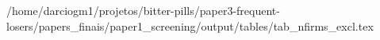 /home/darciogm1/projetos/bitter-pills/paper3-frequent-losers/papers_finais/paper1_screening/output/tables/tab_nfirms_excl.tex